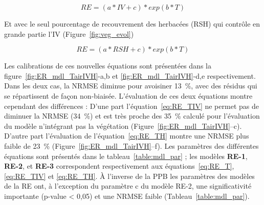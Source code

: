 \begin{equation} \label{eq:RE_TIV}
RE = (a*IV + c)*exp(b*T)
\end{equation}

Et avec le seul pourcentage de recouvrement des herbacées (RSH) qui contrôle en grande partie l'IV (Figure~\ref{fig:veg_evol})

\begin{equation} \label{eq:RE_TH}
RE = (a*RSH + c)*exp(b*T)
\end{equation}

Les calibrations de ces nouvelles équations sont présentées dans la figure~\ref{fig:ER_mdl_TairIVH}-a,b et \ref{fig:ER_mdl_TairIVH}-d,e respectivement.
Dans les deux cas, la NRMSE diminue pour avoisiner \SI{13}{\percent}, avec des résidus qui se répartissent de façon non-biaisée.
L'évaluation de ces deux équations montre cependant des différences :
D'une part l'équation~\ref{eq:RE_TIV} ne permet pas de diminuer la NRMSE (\SI{34}{\percent}) et est très proche des \SI{35}{\percent} calculé pour l'évaluation du modèle n'intégrant pas la végétation (Figure~\ref{fig:ER_mdl_TairIVH}--c).
D'autre part l'évaluation de l'équation~\ref{eq:RE_TH} montre une NRMSE plus faible de \SI{23}{\percent} (Figure~\ref{fig:ER_mdl_TairIVH}--f).
Les paramètres des différentes équations sont présentés dans le tableau~\ref{table:mdl_par} ; les modèles \textbf{RE-1}, \textbf{RE-2}, et \textbf{RE-3} correspondent respectivement aux équations~\ref{eq:RE_T}, \ref{eq:RE_TIV} et \ref{eq:RE_TH}.
À l'inverse de la PPB les paramètres des modèles de la RE ont, à l'exception du paramètre c du modèle RE-2, une significativité importante (p-value < 0,05) et une NRMSE faible (Tableau~\ref{table:mdl_par}).



%

%
%
%
%

